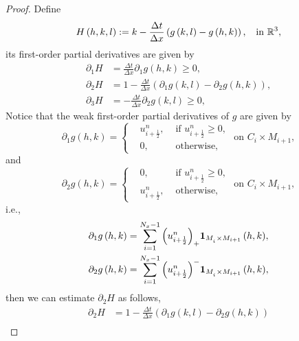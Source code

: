 \documentclass[11pt,a4paper,center,notitlepage]{article}
\numberwithin{equation}{section}
\begin{document}
\begin{proof}
Define 
\begin{align*}
H\left( {h,k,l} \right): = k - \frac{{\Delta t}}{{\Delta x}}\left( {g\left( {k,l} \right) - g\left( {h,k} \right)} \right), \hspace{2mm} \mbox{ in }\mathbb{R}^3 ,
\end{align*}
its first-order partial derivatives are given by 
\begin{align*}
{\partial _1}H &= \frac{{\Delta t}}{{\Delta x}}{\partial _1}g\left( {h,k} \right) \ge 0,\\
{\partial _2}H &= 1 - \frac{{\Delta t}}{{\Delta x}}\left( {{\partial _1}g\left( {k,l} \right) - {\partial _2}g\left( {h,k} \right)} \right),\\
{\partial _3}H &=  - \frac{{\Delta t}}{{\Delta x}}{\partial _2}g\left( {k,l} \right) \ge 0,
\end{align*}
Notice that the weak first-order partial derivatives of $g$ are given by
\begin{equation*}
{\partial _1}g\left( {h,k} \right) = \left\{ \begin{split}
&u_{i + \frac{1}{2}}^n, & \mbox{ if } u_{i + \frac{1}{2}}^n \ge 0,\\
&0, & \mbox{ otherwise},
\end{split} \right. \mbox{ on }C_i\times M_{i+1},
\end{equation*} 
and 
\begin{equation*}
{\partial _2}g\left( {h,k} \right) = \left\{ \begin{split}
& 0, & \mbox{ if } u_{i + \frac{1}{2}}^n \ge 0,\\
& u_{i + \frac{1}{2}}^n, & \mbox{ otherwise},
\end{split} \right. \mbox{ on }C_i\times M_{i+1},
\end{equation*}
i.e., 
\begin{align*}
{\partial _1}g\left( {h,k} \right) &= \sum\limits_{i = 1}^{{N_x} - 1} {{{\left( {u_{i + \frac{1}{2}}^n} \right)}_+ }{{\bf 1}_{{M_{_i}} \times {M_{i + 1}}}}\left( {h,k} \right)} ,\\
{\partial _2}g\left( {h,k} \right) &= \sum\limits_{i = 1}^{{N_x} - 1} {{{\left( {u_{i + \frac{1}{2}}^n} \right)}^ - }{{\bf 1}_{{M_{_i}} \times {M_{i + 1}}}}\left( {h,k} \right)} ,
\end{align*}
then we can estimate $\partial _2 H$ as follows,
\begin{align*}
{\partial _2}H &= 1 - \frac{{\Delta t}}{{\Delta x}}\left( {{\partial _1}g\left( {k,l} \right) - {\partial _2}g\left( {h,k} \right)} \right)\\

\end{align*}
\end{proof}
\end{document}
